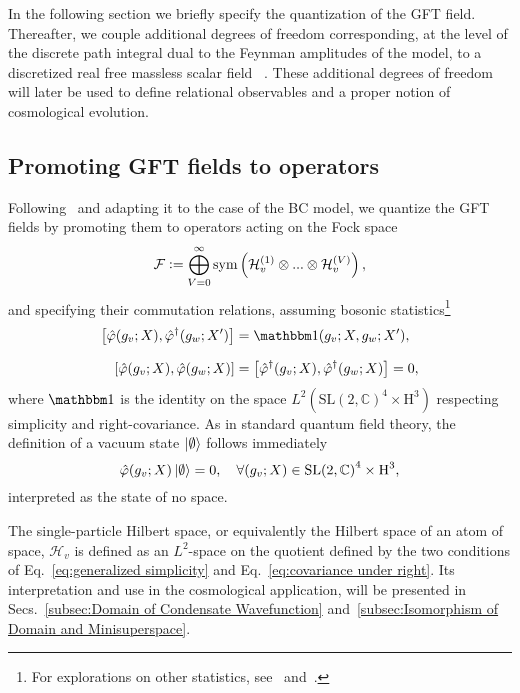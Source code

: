 \documentclass[11pt,a4paper]{article}
\newcommand{\one}{\mathbbm 1}
\newcommand{\C}{\mathbb C}
\newcommand{\SL}{\text{SL$(2,\C)$}}
\newcommand{\HH}{\text{H}^3}
\newcommand{\defeq}{\vcentcolon=}
\begin{document}
In the following section we briefly specify the quantization of the GFT field. Thereafter, we couple additional degrees of freedom corresponding, at the level of the discrete path integral dual to the Feynman amplitudes of the model, to a discretized real free massless scalar field ~\cite{Li:2017uao}. These additional degrees of freedom will later be used to define relational observables and a proper notion of cosmological evolution.

\subsection{Promoting GFT fields to operators}

Following~\cite{Oriti:2013aqa} and adapting it to the case of the BC model, we quantize the GFT fields by promoting them to operators acting on the Fock space
%
\begin{equation}\label{eq:definition of Fock space}
\mathcal{F} 
\defeq
\bigoplus_{V = 0}^\infty \text{sym}\left(\mathcal{H}_v^{(1)}\otimes...\otimes\mathcal{H}_v^{(V)}\right),
\end{equation}
%
and specifying their commutation relations, assuming bosonic statistics\footnote{For explorations on other statistics, see~\cite{Gurau:2011xp} and~\cite{Girelli:2010ct,Baratin:2011tg}.}
%
\begin{equation}\label{eq:commutation relations of group field}
\begin{aligned}
\comm{\hat{\varphi}(g_v;X)}{\hat{\varphi}^{\dagger}(g_w;X')} & = \one(g_v;X,g_w;X'),\\[7pt]
\comm{\hat{\varphi}(g_v;X)}{\hat{\varphi}(g_w;X)} &= \comm{\hat{\varphi}^{\dagger}(g_v;X)}{\hat{\varphi}^{\dagger}(g_w;X)} = 0,
\end{aligned}
\end{equation}
%
where $\one$ is the identity on the space $L^2\left(\SL^4\times\HH\right)$ respecting simplicity and right-covariance. As in standard quantum field theory, the definition of a vacuum state $\ket{\emptyset}$ follows immediately
%
\begin{equation}
\hat{\varphi}(g_v;X)\ket{\emptyset} = 0,\quad \forall (g_v;X)\in \SL^4\times\HH,
\end{equation}
%
interpreted as the state of no space.

The single-particle Hilbert space, or equivalently the Hilbert space of an atom of space, $\mathcal{H}_v$ is defined as an $L^2$-space on the quotient defined by the two conditions of Eq.~\eqref{eq:generalized simplicity} and Eq.~\eqref{eq:covariance under right}. Its interpretation and use in the cosmological application, will be presented in Secs.~\ref{subsec:Domain of Condensate Wavefunction} and~\ref{subsec:Isomorphism of Domain and Minisuperspace}. 
\end{document}
